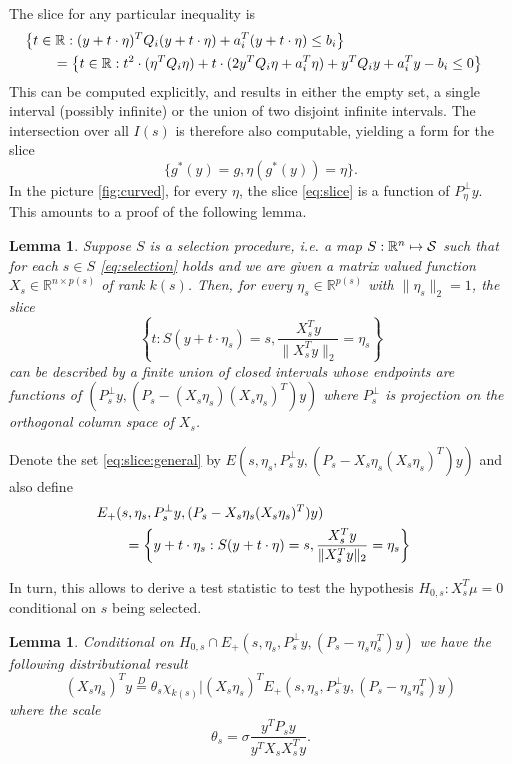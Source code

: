 \documentclass{imsart}
\newcommand{\real}{\mathbb{R}}
\newtheorem{lemma}[theorem]{Lemma}
\begin{document}
The slice for any particular inequality is
$$
\begin{aligned}
\lefteqn{
\left\{t \in \mathbb R : (y+t\cdot \eta)^T Q_i (y+t \cdot \eta) + a_i^T(y+t \cdot \eta) \leq b_i\right\}} \\
 & \qquad = \left\{t \in \mathbb R : t^2 \cdot (\eta^TQ_i\eta) + t \cdot(2 y^TQ_i\eta + a_i^T\eta) + y^TQ_iy + a_i^Ty - b_i \leq 0 \right\} \\
\end{aligned}
$$
This can be computed explicitly, and results in either the empty set, a single interval (possibly infinite) or the union of 
two disjoint infinite intervals. The intersection over all $I(s)$ is therefore also computable, yielding a form for the slice
\begin{equation}
\label{eq:slice}
\{g^*(y)=g, \eta(g^*(y))=\eta\}.
\end{equation}
In the picture \ref{fig:curved}, for every $\eta$, the slice \eqref{eq:slice} is a function
of $P_{\eta}^{\perp}y$. This amounts to a proof of the following lemma.

\begin{lemma}
Suppose $S$ is a selection procedure, i.e. a map $S:\real^n \mapsto {\cal S}$
such that for each $s \in S$ \eqref{eq:selection} holds 
and we are given a matrix valued function $X_s \in \real^{n \times p(s)}$ of rank
$k(s)$.
Then, for every $\eta_s \in \real^{p(s)}$ with $\|\eta_s\|_2=1$, the
slice
\begin{equation}
\label{eq:slice:general}
\left\{t: S(y+t \cdot \eta_s)=s, \frac{X_s^Ty}{\|X_s^Ty\|_2}=\eta_s \right\}
\end{equation}
can be described by
a finite union of closed intervals whose endpoints are functions of 
$(P_s^{\perp}y, (P_s- (X_s\eta_s)(X_s\eta_s)^T)y)$ where
$P_s^{\perp}$ is projection on the orthogonal column space of $X_s$.
\end{lemma}
Denote the set \eqref{eq:slice:general} by $E(s, \eta_s, P_s^{\perp}y, (P_s - X_s \eta_s(X_s\eta_s)^T)y)$ and also define
$$
\begin{aligned}
\lefteqn{
E_+(s, \eta_s, P_s^{\perp}y, (P_s - X_s \eta_s(X_s\eta_s)^T)y) } \\
 & \qquad = \left\{y + t \cdot \eta_s: S(y+t \cdot \eta)=s, \frac{X_s^Ty}{\|X_s^Ty\|_2}=\eta_s \right\} \\
\end{aligned}
$$


In turn, this allows to derive a test statistic to test the hypothesis
$H_{0,s}:X_s^T\mu=0$ conditional on $s$ being selected.
\begin{lemma}
\label{eq:test:dbn}
Conditional on $H_{0,s} \cap E_+(s, \eta_s, P_s^{\perp}y, (P_s - \eta_s\eta_s^T)y)$
we have the following distributional result
\begin{equation}
\label{eq:chi:truncated}
(X_s\eta_s)^Ty \overset{D}{=} \theta_s \chi_{k(s)} | (X_s\eta_s)^TE_+(s, \eta_s, P_s^{\perp}y, (P_s - \eta_s\eta_s^T)y) 
\end{equation}
where the scale 
$$
\theta_s = \sigma \frac{y^TP_sy}{y^TX_sX_s^Ty}.
$$
\end{lemma}
\end{document}
